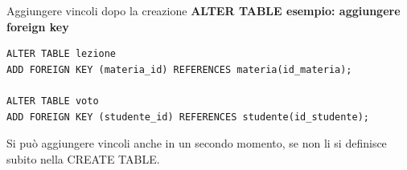 \documentclass{beamer}
\begin{document}
\begin{frame}[fragile]{Aggiungere vincoli dopo la creazione}
\small
\textbf{ALTER TABLE esempio: aggiungere foreign key}

\begin{verbatim}
ALTER TABLE lezione
ADD FOREIGN KEY (materia_id) REFERENCES materia(id_materia);

ALTER TABLE voto
ADD FOREIGN KEY (studente_id) REFERENCES studente(id_studente);
\end{verbatim}

\medskip
\alert{Si può aggiungere vincoli anche in un secondo momento, se non li si definisce subito nella CREATE TABLE.}
\end{frame}
\end{document}
